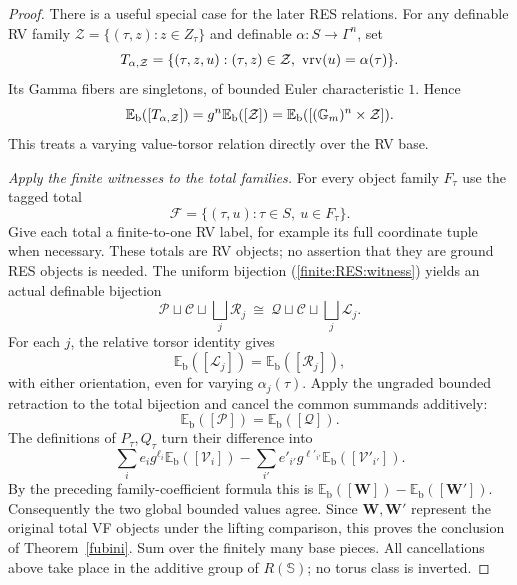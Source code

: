 \begin{proof}
There is a useful special case for the later RES relations.
For any definable RV family
$\mathcal Z=\{(\tau,z):z\in Z_\tau\}$ and definable
$\alpha:S\to\Gamma^n$, set
\[
 T_{\alpha,\mathcal Z}
  =\{(\tau,z,u):(\tau,z)\in\mathcal Z,\
                        \operatorname{vrv}(u)=\alpha(\tau)\}.
\]
Its Gamma fibers are singletons, of bounded Euler
characteristic $1$. Hence
\begin{equation}\label{fubini:relative:torsor}
 \mathbb E_{\mathrm b}([T_{\alpha,\mathcal Z}])
      =g^n\mathbb E_{\mathrm b}([\mathcal Z])
      =\mathbb E_{\mathrm b}([(\mathbb G_m)^n\times\mathcal Z]).
\end{equation}
This treats a varying value-torsor relation directly over
the RV base.

\medskip
\noindent\emph{Apply the finite witnesses to the total families.}
For every object family $F_\tau$ use the tagged total
\[
 \mathcal F=\{(\tau,u):\tau\in S,\ u\in F_\tau\}.
\]
Give each total a finite-to-one RV label, for example its
full coordinate tuple when necessary.
These totals are RV objects; no assertion that they are
ground RES objects is needed.
The uniform bijection (\ref{finite:RES:witness}) yields
an actual definable bijection
\[
 \mathcal P\sqcup\mathcal C\sqcup\bigsqcup_j\mathcal R_j
       \ \cong\
 \mathcal Q\sqcup\mathcal C\sqcup\bigsqcup_j\mathcal L_j .
\]
For each $j$, the relative torsor identity gives
\[
 \mathbb E_{\mathrm b}([\mathcal L_j])
       =\mathbb E_{\mathrm b}([\mathcal R_j]),
\]
with either orientation, even for varying
$\alpha_j(\tau)$.
Apply the ungraded bounded retraction to the total
bijection and cancel the common summands additively:
\[
 \mathbb E_{\mathrm b}([\mathcal P])
       =\mathbb E_{\mathrm b}([\mathcal Q]).
\]
The definitions of $P_\tau,Q_\tau$ turn their difference
into
\[
 \sum_i e_i g^{\ell_i}\mathbb E_{\mathrm b}([\mathcal V_i])
   -\sum_{i'}e'_{i'}g^{\ell'_{i'}}
                   \mathbb E_{\mathrm b}([\mathcal V'_{i'}]).
\]
By the preceding family-coefficient formula this is
$\mathbb E_{\mathrm b}([\bm W])
 -\mathbb E_{\mathrm b}([\bm W'])$.
Consequently the two global bounded values agree.
Since $\bm W,\bm W'$ represent the original total
VF objects under the lifting comparison, this proves
the conclusion of Theorem~\ref{fubini}.
Sum over the finitely many base pieces.
All cancellations above take place in the additive
group of $R(\mathbb S)$; no torus class is inverted.
\end{proof}
